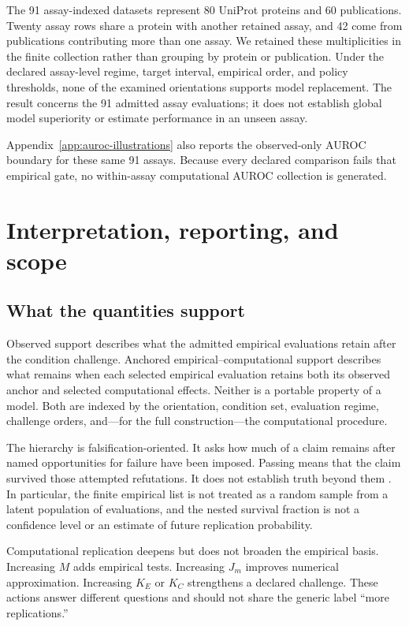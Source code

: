 \documentclass[11pt]{article}
\theoremstyle{remark}
\begin{document}
The 91 assay-indexed datasets represent 80 UniProt proteins and 60
publications. Twenty assay rows share a protein with another retained assay,
and 42 come from publications contributing more than one assay. We retained
these multiplicities in the finite collection rather than grouping by protein
or publication. Under the declared assay-level regime, target interval,
empirical order, and policy thresholds, none of the examined orientations
supports model replacement. The result concerns the 91 admitted assay
evaluations; it does not establish global model superiority or estimate
performance in an unseen assay.

Appendix~\ref{app:auroc-illustrations} also reports the observed-only AUROC
boundary for these same 91 assays. Because every declared comparison fails
that empirical gate, no within-assay computational AUROC collection is
generated.


\section{Interpretation, reporting, and scope}
\label{sec:discussion}

\subsection{What the quantities support}

Observed support describes what the admitted empirical evaluations retain
after the condition challenge. Anchored empirical--computational support
describes what remains when each selected empirical evaluation retains both
its observed anchor and selected computational effects. Neither is a portable
property of a model. Both are indexed by the orientation, condition set,
evaluation regime, challenge orders, and---for the full construction---the
computational procedure.

The hierarchy is falsification-oriented. It asks how much of a claim remains
after named opportunities for failure have been imposed. Passing means that the
claim survived those attempted refutations. It does not establish truth beyond
them \cite{popper1959logic,popper1963conjectures}. In particular, the finite
empirical list is not treated as a random sample from a latent population of
evaluations, and the nested survival fraction is not a confidence level or an
estimate of future replication probability.

Computational replication deepens but does not broaden the empirical basis.
Increasing $M$ adds empirical tests. Increasing $J_m$ improves numerical
approximation. Increasing $K_E$ or $K_C$ strengthens a declared challenge.
These actions answer different questions and should not share the generic label
``more replications.''
\end{document}
